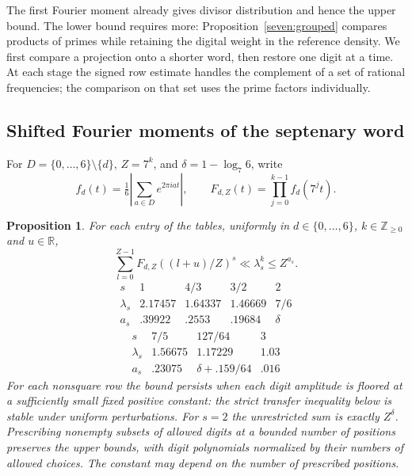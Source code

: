 \documentclass[11pt,a4paper]{article}
\theoremstyle{paperplain}
\newtheorem{proposition}[theorem]{Proposition}
\numberwithin{equation}{section}
\begin{document}
The first Fourier moment already gives divisor distribution and hence the
upper bound. The lower bound requires more: Proposition~\ref{seven:grouped}
compares products of primes while retaining the digital weight in the
reference density. We first compare a projection onto a shorter word,
then restore one digit at a time. At each stage the signed row estimate
handles the complement of a set of rational frequencies; the comparison
on that set uses the prime factors individually.

\subsection{Shifted Fourier moments of the septenary word}
\label{b7:fourier-section}

For \(D=\{0,\ldots,6\}\setminus\{d\}\), \(Z=7^k\), and
\(\delta=1-\log_7 6\), write
\[
 f_d(t)=\tfrac16\left|\sum_{a\in D}e^{2\pi i at}\right|,
 \qquad F_{d,Z}(t)=\prod_{j=0}^{k-1} f_d(7^jt).
\]

\begin{proposition}\label{b7:word-moments}
For each entry of the tables, uniformly in \(d\in\{0,\ldots,6\}\),
\(k\in\mathbb Z_{\ge0}\) and \(u\in\mathbb R\),
\[
 \sum_{l=0}^{Z-1} F_{d,Z}((l+u)/Z)^s\ll\lambda_s^k\le Z^{a_s}.
\]
\[
\begin{array}{c|rrrr}
 s&1&4/3&3/2&2\\ \hline
 \lambda_s&2.17457&1.64337&1.46669&7/6\\
 a_s&.39922&.2553&.19684&\delta
\end{array}
\]
\[
\begin{array}{c|rrr}
 s&7/5&127/64&3\\ \hline
 \lambda_s&1.56675&1.17229&1.03\\
 a_s&.23075&\delta+.159/64&.016
\end{array}
\]
For each nonsquare row the bound persists when each digit amplitude
is floored at a sufficiently small fixed positive constant: the strict
transfer inequality below is stable under uniform perturbations.
For \(s=2\) the unrestricted sum is exactly \(Z^\delta\).
Prescribing nonempty subsets of allowed digits at a bounded number
of positions preserves the upper bounds, with digit polynomials normalized
by their numbers of allowed choices. The constant may depend on the number
of prescribed positions.
\end{proposition}
\end{document}
